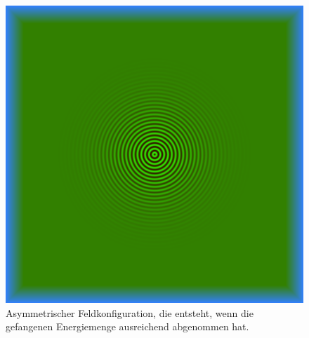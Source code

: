 \begin{figure}
    \includegraphics{papers/particles/figures/wavesim/particle_initial_state.png}
    \caption{Asymmetrischer Feldkonfiguration, die entsteht, wenn die gefangenen Energiemenge ausreichend abgenommen hat.\ }\label{particles:fig:partikel:abnehmen:asymmetrisch}
\end{figure}